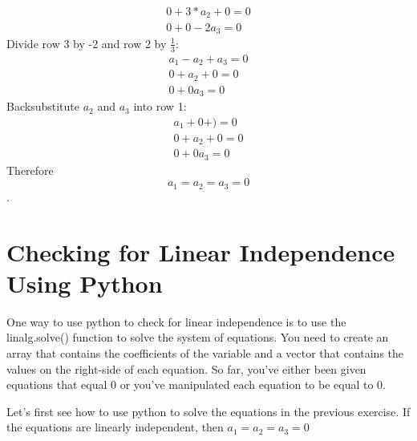 \begin{Answer}[ref=vector_independence]
$$\begin{matrix}
			0 +   3*a_2 +0    = 0 \\
			0   + 0   - 2a_3 = 0
		\end{matrix} $$
    Divide row 3 by -2 and row 2 by $\frac{1}{3}$:
    	$$\begin{matrix}
			a_1 - a_2 + a_3 = 0 \\
			0 +   a_2 +0    = 0 \\
			0   + 0   a_3 = 0
		\end{matrix} $$
	Backsubstitute $a_2$ and $a_3$ into row 1:
	 	$$\begin{matrix}
			a_1 +0 + ) = 0 \\
			0 +   a_2 +0   = 0 \\
			0   + 0   a_3 = 0
		\end{matrix} $$
	 Therefore $$a_1 = a_2 = a_3 = 0$$.
\end{Answer}
    
\section{Checking for Linear Independence Using Python}  
One way to use python to check for linear independence is to use the linalg.solve() function to solve the system of equations. You need to create an array that contains the coefficients of the variable and a vector that contains the values on the right-side of each equation. So far, you've either been given equations that equal 0 or you've manipulated each equation to be equal to 0. 

Let's first see how to use python to solve the equations in the previous exercise. If the equations are linearly independent, then $a_1 = a_2 = a_3 = 0$

